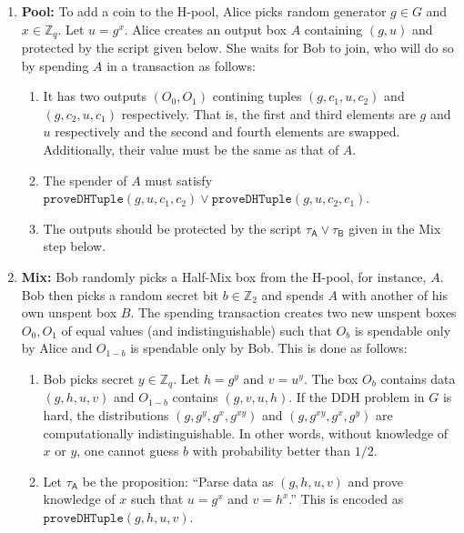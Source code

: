 \documentclass[11pt]{article}
\begin{document}
\begin{enumerate}
	\item \textbf{Pool:} To add a coin to the H-pool, Alice picks random generator $g\in G$ and $x\in \mathbb{Z}_q$. Let $u = g^{x}$. Alice creates an output box $A$ containing $(g, u)$ and protected by the script given below. She waits for Bob to join, who will do so by spending $A$ in a transaction as follows: 
	
	\begin{enumerate}
		\item It has two outputs $(O_0, O_1)$ contining tuples $(g, c_1, u, c_2)$ and $(g, c_2, u, c_1)$ respectively. That is, the first and third elements are $g$ and $u$ respectively and the second and fourth elements are swapped. Additionally, their value must be the same as that of $A$.
		\item The spender of $A$ must satisfy $\texttt{proveDHTuple}(g, u, c_1, c_2)\lor \texttt{proveDHTuple}(g, u, c_2, c_1)$.
		\item The outputs should be protected by the script $\tau_\textsf{A} \lor \tau_\textsf{B}$ given in the Mix step below.
	\end{enumerate}
	
	
	\item \textbf{Mix:} Bob randomly picks a Half-Mix box from the H-pool, for instance, $A$. Bob then picks a random secret bit $b \in \mathbb{Z}_2$ and spends $A$ with another of his own unspent box $B$. The spending transaction creates two new unspent boxes $O_0, O_1$ of equal values (and indistinguishable) such that $O_b$ is spendable only by Alice and $O_{1-b}$ is spendable only by Bob. This is done as follows:
	
	\begin{enumerate}
		\item Bob picks secret $y\in \mathbb{Z}_q$. Let $h = {g}^{y}$ and $v = {u}^{y}$.  %
		The box $O_b$ contains data $(g, h, u, v)$ and $O_{1-b}$ contains $(g, v, u, h)$. If the DDH problem in $G$ is hard, the distributions $(g, {g}^{y}, {g}^{x}, {g}^{xy})$ and 
		$(g, {g}^{xy}, {g}^{x}, {g}^{y})$ are computationally indistinguishable. In other words, without knowledge of $x$ or $y$, one cannot guess $b$ with probability better than $1/2$.
		\item  Let 
		$\tau_\textsf{A}$ be the proposition: ``Parse data as $(g, h, u, v)$ and
		prove knowledge of $x$ such that $u = {g}^{x}$ and ${v} = {h}^{x}$.'' This is encoded as $\texttt{proveDHTuple}(g, h, u, v)$.
		

\end{enumerate}
\end{enumerate}
\end{document}
